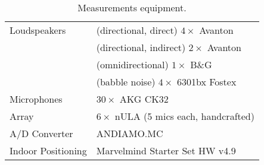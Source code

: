 \begin{table}[]
    \centering
    \small
    \begin{tabular}{ll}
        \toprule
         Loudspeakers   & (directional, direct) $4 \times$ Avanton\\
                        & (directional, indirect) $2 \times$ Avanton\\
                        & (omnidirectional) $1 \times$ B\&G\\
                        & (babble noise) $4 \times$ 6301bx Fostex\\
         \hline
         Microphones    & $30 \times$ AKG CK32\\
         Array          & $6 \times$ nULA (5 mics each, handcrafted)\\
         \hline
         A/D Converter  & ANDIAMO.MC\\
         \hline
         Indoor Positioning & Marvelmind Starter Set HW v4.9\\
         \bottomrule
    \end{tabular}
    \caption{Measurements equipment.}
    \label{tab:room_equipment}
\end{table}